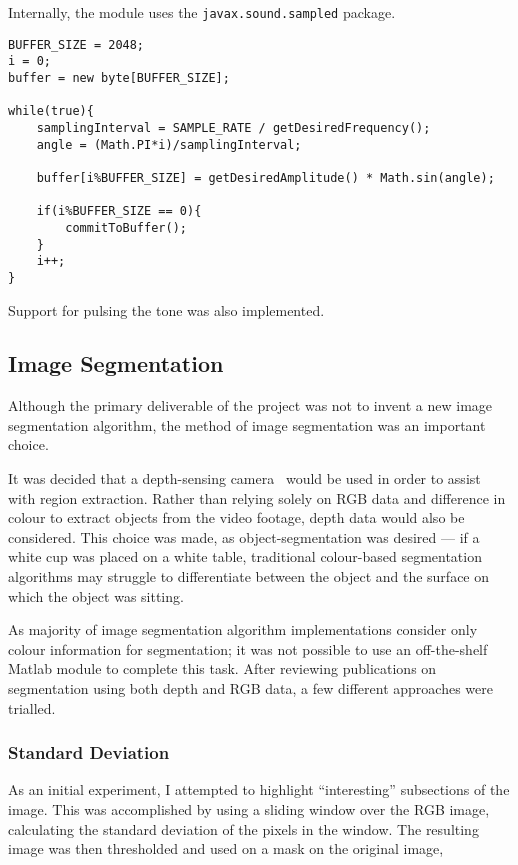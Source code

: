 Internally, the module uses the \texttt{javax.sound.sampled} package. 

\begin{verbatim}
BUFFER_SIZE = 2048;
i = 0;
buffer = new byte[BUFFER_SIZE];

while(true){
    samplingInterval = SAMPLE_RATE / getDesiredFrequency();
    angle = (Math.PI*i)/samplingInterval;

    buffer[i%BUFFER_SIZE] = getDesiredAmplitude() * Math.sin(angle);

    if(i%BUFFER_SIZE == 0){
        commitToBuffer();
    }
    i++;
}
\end{verbatim}

Support for pulsing the tone was also implemented. 

\subsection{Image Segmentation}
Although the primary deliverable of the project was not to invent a new image segmentation algorithm, the method of image segmentation was an important choice.

It was decided that a depth-sensing camera~\cite{xtion} would be used in order to assist with region extraction. Rather than relying solely on RGB data and difference in colour to extract objects from the video footage, depth data would also be considered. This choice was made, as object-segmentation was desired --- if a white cup was placed on a white table, traditional colour-based segmentation algorithms may struggle to differentiate between the object and the surface on which the object was sitting.

As majority of image segmentation algorithm implementations consider only colour information for segmentation; it was not possible to use an off-the-shelf Matlab module to complete this task. After reviewing publications on segmentation using both depth and RGB data, a few different approaches were trialled.

\subsubsection{Standard Deviation}
As an initial experiment, I attempted to highlight ``interesting'' subsections of the image. This was accomplished by using a sliding window over the RGB image, calculating the standard deviation of the pixels in the window. The resulting image was then thresholded and used on a mask on the original image,

